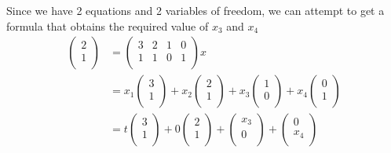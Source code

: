 \documentclass[letterpaper, 12pt]{article}
\begin{document}
    Since we have 2 equations and 2 variables of freedom, we can attempt to get a formula that obtains the required
    value of $x_3$ and $x_4$\\
    \begin{align*}
        \begin{pmatrix}
            2\\
            1\\
        \end{pmatrix} &= \begin{pmatrix}
            3 & 2 & 1 & 0\\
            1 & 1 & 0 & 1\\
        \end{pmatrix}x\\
        &= x_1\begin{pmatrix}
            3\\
            1\\
        \end{pmatrix} + x_2\begin{pmatrix}
            2\\
            1\\
        \end{pmatrix} + x_3\begin{pmatrix}
            1\\
            0\\
        \end{pmatrix} + x_4\begin{pmatrix}
            0\\
            1\\
        \end{pmatrix}\\
        &= t\begin{pmatrix}
            3\\
            1\\
        \end{pmatrix} + 0\begin{pmatrix}
            2\\
            1\\
        \end{pmatrix} + \begin{pmatrix}
            x_3\\
            0\\
        \end{pmatrix} + \begin{pmatrix}
            0\\
            x_4\\

\end{pmatrix}
\end{align*}
\end{document}
